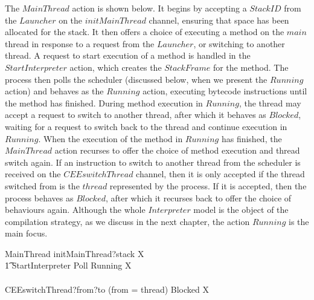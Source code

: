 The $MainThread$ action is shown below.
It begins by accepting a $StackID$ from the $Launcher$ on the
$initMainThread$ channel, ensuring that space has been allocated for
the stack.
It then offers a choice of executing a method on the $main$ thread in
response to a request from the $Launcher$, or switching to another
thread.
A request to start execution of a method is handled in the
$StartInterpreter$ action, which creates the $StackFrame$ for the
method.
The process then polls the scheduler (discussed below, when we present
the $Running$ action) and behaves as the $Running$ action, executing
bytecode instructions until the method has finished.
During method execution in $Running$, the thread may accept a request
to switch to another thread, after which it behaves as $Blocked$,
waiting for a request to switch back to the thread and continue
execution in $Running$.
When the execution of the method in $Running$ has finished, the
$MainThread$ action recurses to offer the choice of method execution
and thread switch again.
If an instruction to switch to another thread from the scheduler is
received on the $CEEswitchThread$ channel, then it is only accepted if
the thread switched from is the $thread$ represented by the process.
If it is accepted, then the process behaves as $Blocked$, after which
it recurses back to offer the choice of behaviours again.
Although the whole $Interpreter$ model is the object of the
compilation strategy, as we discuss in the next chapter, the action
$Running$ is the main focus.
\begin{circusaction}
  MainThread \circdef initMainThread?stack \then \circmu X \circspot \\
  \t1 \circblockbegin
  StartInterpreter \circseq Poll \circseq Running \circseq X \\
  {} \extchoice {} \\
  CEEswitchThread?from?to \prefixcolon (from = thread) \then Blocked \circseq X
  \circblockend
\end{circusaction}

